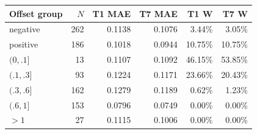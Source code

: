 \begin{inlinetable}
\centering
\caption{Errors by offset sign and magnitude after 105,000 adaptation iterations on the empirical-offset subset. MAE is in DN, and W denotes the fraction with increased error relative to zero correction. Sign and magnitude define overlapping groups drawn from eight scenes.}\label{tab:buckets}
\footnotesize
\setlength{\tabcolsep}{3pt}
\begin{tabular}{lrrrrr}
\toprule
Offset group & $N$ & T1 MAE & T7 MAE & T1 W & T7 W \\
\midrule
negative & 262 & 0.1138 & 0.1076 & 3.44\% & 3.05\% \\
positive & 186 & 0.1018 & 0.0944 & 10.75\% & 10.75\% \\
$(0,.1]$ & 13 & 0.1107 & 0.1092 & 46.15\% & 53.85\% \\
$(.1,.3]$ & 93 & 0.1224 & 0.1171 & 23.66\% & 20.43\% \\
$(.3,.6]$ & 162 & 0.1279 & 0.1189 & 0.62\% & 1.23\% \\
$(.6,1]$ & 153 & 0.0796 & 0.0749 & 0.00\% & 0.00\% \\
$>1$ & 27 & 0.1115 & 0.1006 & 0.00\% & 0.00\% \\
\bottomrule
\end{tabular}
\end{inlinetable}
